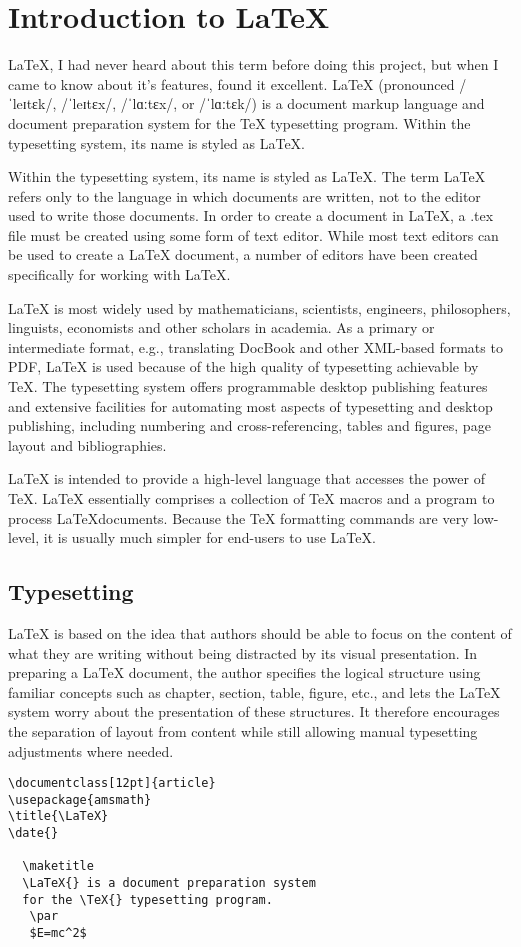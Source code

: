\section{Introduction to \LaTeX}

\LaTeX, I had never heard about this term before doing this project,
but when I came to know about it's features, found it excellent. 
\LaTeX{} (pronounced /ˈleɪtɛk/, /ˈleɪtɛx/, /ˈlɑːtɛx/, or /ˈlɑːtɛk/) is a 
document markup language and document preparation system for the \TeX{} 
typesetting  program. Within the typesetting system, its name is styled 
as \LaTeX.


Within the typesetting system, its name is styled as \LaTeX. The term 
\LaTeX{} refers only to the language in which documents are written, 
not to the editor used to write those documents. In order to create a 
document in \LaTeX, a .tex file must be created using some form of text 
editor. While most text editors can be used to create a \LaTeX{} document, 
a number of editors have been created specifically for working with \LaTeX.

\LaTeX{} is most widely used by mathematicians, scientists, 
engineers, philosophers, linguists, economists and other scholars in 
academia. As a primary or intermediate format, e.g., translating DocBook 
and other XML-based formats to PDF, \LaTeX{} is used because of the 
high quality of typesetting achievable by \TeX. The typesetting system 
offers programmable desktop publishing features and extensive facilities 
for automating most aspects of typesetting and desktop publishing, 
including numbering and cross-referencing, tables and figures, 
page layout and bibliographies.

\LaTeX{} is intended to provide a high-level language that
accesses the power of \TeX. \LaTeX{} essentially comprises a
collection of \TeX{} macros and a program to process \LaTeX documents. 
Because the \TeX{} formatting commands are very low-level, it is usually 
much simpler for end-users to use \LaTeX{}.


\subsection{Typesetting}
\LaTeX{} is based on the idea that authors should be able to focus on 
the content of what they are writing without being distracted by its 
visual presentation. In preparing a \LaTeX{} document, the author 
specifies the logical structure using familiar concepts such as 
chapter, section, table, figure, etc., and lets the \LaTeX{} system 
worry about the presentation of these structures. It therefore 
encourages the separation of layout from content while still allowing 
manual typesetting adjustments where needed. 

\begin{verbatim}
\documentclass[12pt]{article}
\usepackage{amsmath}
\title{\LaTeX}
\date{}

  \maketitle 
  \LaTeX{} is a document preparation system 
  for the \TeX{} typesetting program.
   \par 
   $E=mc^2$

\end{verbatim}

